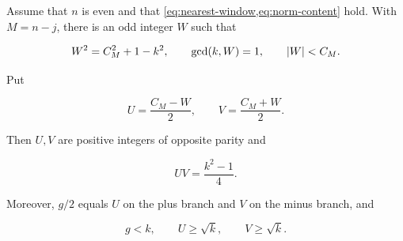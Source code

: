 \begin{lemma}
\label{lem:rectangle}
Assume that $n$ is even and that
\cref{eq:nearest-window,eq:norm-content} hold. With $M=n-j$,
there is an odd integer $W$ such that

\begin{equation}
 W^2=C_M^2+1-k^2,
 \qquad
 \gcd(k,W)=1,
 \qquad
 \lvert W\rvert<C_M.
 \label{eq:W-relation}
\end{equation}

Put

\begin{equation}
 U=\frac{C_M-W}{2},
 \qquad
 V=\frac{C_M+W}{2}.
 \label{eq:UV}
\end{equation}

Then $U,V$ are positive integers of opposite parity and

\begin{equation}
 UV=\frac{k^2-1}{4}.
 \label{eq:UV-product}
\end{equation}

Moreover, $g/2$ equals $U$ on the plus branch and $V$ on the minus branch,
and

\begin{equation}
 g<k,
 \qquad
 U\geqslant\sqrt{k},
 \qquad
 V\geqslant\sqrt{k}.
 \label{eq:factor-lower}
\end{equation}
\end{lemma}

